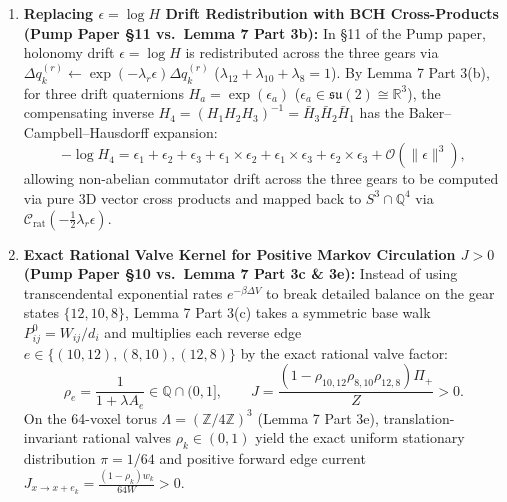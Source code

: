 \documentclass[11pt, a4paper]{article}
\begin{document}
\begin{enumerate}
\begin{itemize}
        \item For small or rational-approximated fractional steps $w \in \mathbb{Q}$ (such as $w = 1/10$), apply the rational tangent-addition / Pad\'e approximant $\mathbf{u}_w = w\,\mathbf{u}\left(1 + \frac{1-w^2}{3}\|\mathbf{u}\|^2\right)^{-1} \in \mathbb{Q}^3$ and map back via $\mathcal{C}_{\text{rat}}(\mathbf{u}_w) \in S^3 \cap \mathbb{Q}^4$. Every lifted increment $\hat{q}_n^{(12)}$ then has exact unit norm $N(\mathcal{C}_{\text{rat}}(\mathbf{u}_w)) = 1$ over $\mathbb{Q}$ with zero floating-point renormalization!
    \end{itemize}
    \item \textbf{Replacing $\epsilon = \log H$ Drift Redistribution with BCH Cross-Products (Pump Paper §11 vs.\ Lemma 7 Part 3b):}
    In §11 of the Pump paper, holonomy drift $\epsilon = \log H$ is redistributed across the three gears via $\Delta q_k^{(r)} \leftarrow \exp(-\lambda_r \epsilon)\Delta q_k^{(r)}$ ($\lambda_{12} + \lambda_{10} + \lambda_8 = 1$). By Lemma 7 Part 3(b), for three drift quaternions $H_a = \exp(\epsilon_a)$ ($\epsilon_a \in \mathfrak{su}(2) \cong \mathbb{R}^3$), the compensating inverse $H_4 = (H_1 H_2 H_3)^{-1} = \bar{H}_3\bar{H}_2\bar{H}_1$ has the Baker--Campbell--Hausdorff expansion:
    \begin{equation}
    -\log H_4 = \epsilon_1 + \epsilon_2 + \epsilon_3 + \epsilon_1 \times \epsilon_2 + \epsilon_1 \times \epsilon_3 + \epsilon_2 \times \epsilon_3 + \mathcal{O}(\|\epsilon\|^3),
    \end{equation}
    allowing non-abelian commutator drift across the three gears to be computed via pure 3D vector cross products and mapped back to $S^3 \cap \mathbb{Q}^4$ via $\mathcal{C}_{\text{rat}}(-\frac{1}{2}\lambda_r \epsilon)$.
    \item \textbf{Exact Rational Valve Kernel for Positive Markov Circulation $J > 0$ (Pump Paper §10 vs.\ Lemma 7 Part 3c \& 3e):}
    Instead of using transcendental exponential rates $e^{-\beta\Delta V}$ to break detailed balance on the gear states $\{12, 10, 8\}$, Lemma 7 Part 3(c) takes a symmetric base walk $P_{ij}^0 = W_{ij}/d_i$ and multiplies each reverse edge $e \in \{(10,12), (8,10), (12,8)\}$ by the exact rational valve factor:
    \begin{equation}
    \rho_e = \frac{1}{1 + \lambda A_e} \in \mathbb{Q} \cap (0, 1], \qquad J = \frac{(1 - \rho_{10,12}\rho_{8,10}\rho_{12,8})\Pi_+}{Z} > 0.
    \end{equation}
    On the 64-voxel torus $\Lambda = (\mathbb{Z}/4\mathbb{Z})^3$ (Lemma 7 Part 3e), translation-invariant rational valves $\rho_k \in (0,1)$ yield the exact uniform stationary distribution $\pi = 1/64$ and positive forward edge current $J_{x \to x+e_k} = \frac{(1-\rho_k)w_k}{64W} > 0$.
\end{enumerate}
\end{document}
